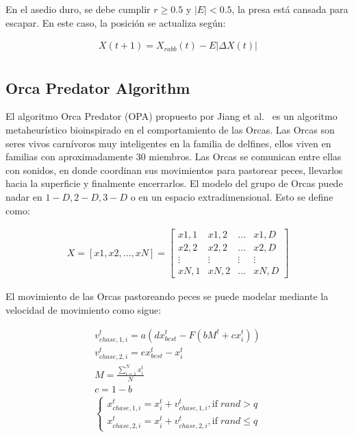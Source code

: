\documentclass[conference]{IEEEtran}
\begin{document}
\noindent En el asedio duro, se debe cumplir $r \geq 0.5$ y $|E| < 0.5$, la presa está cansada para escapar. En este caso, la posición se actualiza según:

\begin{equation}
	\begin{gathered}
		X(t+1) = X_{rabb}(t) - E |\Delta X(t)| \\
	\end{gathered}
	\label{eq17}
\end{equation}

\subsection{Orca Predator Algorithm}

\noindent El algoritmo Orca Predator (OPA) propuesto por Jiang et al.~\cite{Jiang2022} es un algoritmo metaheurístico bioinspirado en el comportamiento de las Orcas. Las Orcas son seres vivos carnívoros muy inteligentes en la familia de delfines, ellos viven en familias con aproximadamente 30 miembros. Las Orcas se comunican entre ellas con sonidos, en donde coordinan sus movimientos para pastorear peces, llevarlos hacia la superficie y finalmente encerrarlos. El modelo del grupo de Orcas puede nadar en $1-D, 2-D, 3-D$ o en un espacio extradimensional. Esto se define como:

\begin{equation}
	\begin{gathered}
		X = [ x1, x2, ..., xN ] =\begin{bmatrix}
			x1,1 & x1,2 & ... & x1,D  \\
			x2,2 & x2,2 & ... & x2,D  \\
			\vdots & \vdots & \vdots & \vdots \\
			xN,1 & xN,2 & ... & xN,D
		\end{bmatrix}
	\end{gathered}
	\label{eq18}
\end{equation}

\noindent El movimiento de las Orcas pastoreando peces se puede modelar mediante la velocidad de movimiento como sigue:

\begin{equation}
	\begin{gathered}
		v_{chase,1,i}^t = a ( d x_{best}^t - F (b M^t + c x_i^t)) \\
		v_{chase,2,i}^t = e x_{best}^t - x_{i}^t \\
		M = \frac{\sum_{i=1}^{N} x_i^t}{N} \\
		c=1-b \\
		\begin{cases}
			x_{chase,1,i}^t = x_{i}^t + v_{chase,1,i}^t , \text{if} \;rand > q     \\
			x_{chase,2,i}^t = x_{i}^t + v_{chase,2,i}^t  , \text{if} \;rand \leq q 
		\end{cases}
	\end{gathered}
	\label{eq19}
\end{equation}
\end{document}
